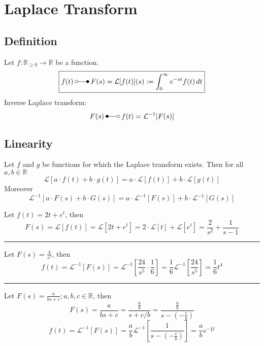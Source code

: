 \section{Laplace Transform}
\subsection{Definition}
Let $f:\mathbb{R}_{\geq 0} \rightarrow \mathbb{R}$ be a function.
\begin{equation*}
    \boxed{
    f(t)\:\laplace\:F(s)=\mathcal{L}[f(t)](s):=\int_{0}^{\infty}e^{-st}f(t)\,dt 
    }
\end{equation*}
Inverse Laplace transform:
\begin{equation*}
    F(s)\:\Laplace\:f(t)=\mathcal{L}^{-1}[F(s)]
\end{equation*}

\subsection{Linearity}
Let $f$ and $g$ be functions for which the Laplace transform exists. Then for all $a,b \in \mathbb{R}$
\begin{equation*}
    \mathcal{L}[a\cdot f(t)+b\cdot g(t)] = a\cdot\mathcal{L}[f(t)]+b\cdot\mathcal{L}[g(t)]
\end{equation*}
Moreover
\begin{equation*}
    \mathcal{L}^{-1}[a\cdot F(s)+b\cdot G(s)] = a\cdot\mathcal{L}^{-1}[F(s)]+b\cdot\mathcal{L}^{-1}[G(s)]
\end{equation*}

\begin{examplesection}[Example]
    Let $f(t)=2t+e^t$, then
    \begin{equation*}
        F(s)=\mathcal{L}[f(t)]=\mathcal{L}[2t+e^t]=2\cdot\mathcal{L}[t] + \mathcal{L}[e^t]=\frac{2}{s^2}+\frac{1}{s-1}
    \end{equation*}
    \hrule{}
    Let $F(s)=\frac{4}{s^5}$, then
    \begin{equation*}
        f(t)=\mathcal{L}^{-1}[F(s)]=\mathcal{L}^{-1}\left[\frac{24}{s^5}\cdot\frac16\right]=\frac16\mathcal{L}^{-1}\left[\frac{24}{s^5}\right]=\frac16t^4
    \end{equation*}
    \hrule{}
    Let $F(s)=\frac{a}{bs+c}; a,b,c \in \mathbb{R}$, then
    \begin{equation*}
        F(s)=\frac{a}{bs+c}=\frac{\frac{a}{b}}{s+c/b}=\frac{\frac{a}{b}}{s-(-\frac{c}{b})}
    \end{equation*}
    \begin{equation*}
        f(t)=\mathcal{L}^{-1}[F(s)]=\frac{a}{b}\mathcal{L}^{-1}\left[\frac{1}{s-(-\frac{c}{b})}\right]=\frac{a}{b}e^{-\frac{c}{b}t}
    \end{equation*}
\end{examplesection}


